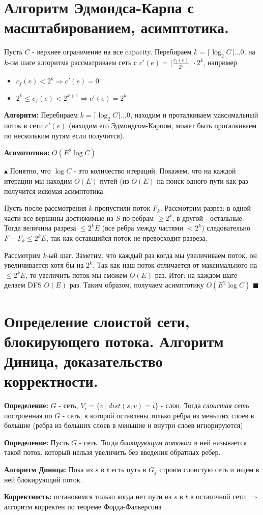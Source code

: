 \setcounter{section}{80}
\section{Алгоритм Эдмондса-Карпа с масштабированием, асимптотика.}
\par Пусть $C$ - верхнее ограничение на все capacity. Перебираем $k=\lceil \log_2 C \rceil \ldots 0$, на $k$-ом шаге алгоритма рассматриваем сеть с $c'(e)=\lfloor \frac{c_f(e)}{2^k} \rfloor \cdot 2^k$, например
 \begin{itemize}
    \item[]$c_f(e)<2^k \Rightarrow c'(e)=0$
    \item[] $2^k\leq c_f(e)<2^{k+1}\Rightarrow c'(e)=2^k$
\end{itemize}
\par \textbf{Алгоритм:} Перебираем  $k=\lceil \log_2 C \rceil \ldots 0$, находим и проталкиваем максимальный поток в сети $c'(e)$ (находим его Эдмондсом-Карпом, может быть проталкиваем по нескольким путям если получится).
\par \textbf{Асимптотика:} $O(E^2 \log C)$
\par $\blacktriangle$ Понятно, что $\log C$ - это количество итераций. Покажем, что на каждой итерации мы находим $O(E)$ путей (из $O(E)$ на поиск одного пути как раз получится искомая асимптотика.
\par Пусть после рассмотрения $k$ пропустили поток $F_k$. Рассмотрим разрез: в одной части все вершины достижимые из $S$ по ребрам $\geq 2^k$, в другой - остальные. Тогда величина разреза $\leq 2^kE$ (все ребра между частями $<2^k$) следовательно $F-F_k \leq 2^k E$, так как оставшийся поток не превосходит разреза.
\par Рассмотрим $k$-ый шаг. Заметим, что каждый раз когда мы увеличиваем поток, он увеличивается хотя бы на $2^k$. Так как наш поток отличается от максимального на $\leq 2^k E$, то увеличить поток мы сможем $O(E)$ раз. Итог: на каждом шаге делаем DFS $O(E)$ раз. Таким образом, получаем асимптотику $O(E^2 \log C)$ $\blacksquare$

\setcounter{section}{81}
\section{Определение слоистой сети, блокирующего потока. Алгоритм Диница, доказательство корректности.}
\par \textbf{Определение:} $G$ - сеть, $V_i=\{v \: | \: dist(s,v)=i\}$ - слои. Тогда \textit{слоистая сеть} построенная по $G$ - сеть, в которой оставлены только ребра из меньших слоев в большие (ребра из больших слоев в меньшие и внутри слоев игнорируются)
\par \textbf{Определение:} Пусть $G$ - сеть. Тогда \textit{блокирующим потоком} в ней называется такой поток, который нельзя увеличить без введения обратных ребер.
\par \textbf{Алгоритм Диница:} Пока из $s$ в $t$ есть путь в $G_f$ строим слоистую сеть и ищем в ней блокирующий поток.
\par \textbf{Корректность:} остановимся только когда нет пути из $s$ в $t$ в остаточной сети $\Rightarrow$ алгоритм корректен по теореме Форда-Фалкерсона

